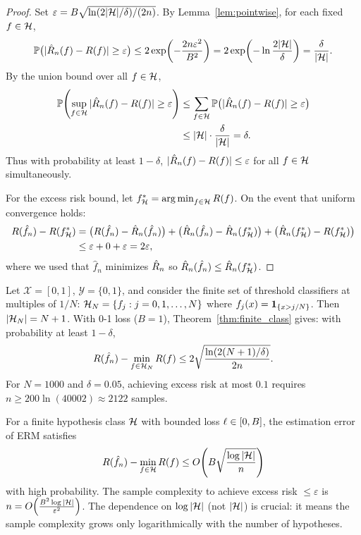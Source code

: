 \documentclass[11pt,a4paper]{article}
\begin{document}
\begin{proof}
Set $\varepsilon = B\sqrt{\ln(2|\mathcal{H}|/\delta)/(2n)}$.  By
Lemma~\ref{lem:pointwise}, for each fixed $f \in \mathcal{H}$,
\[
    \mathbb{P}\bigl(|\hat{R}_n(f) - R(f)| \geq \varepsilon\bigr)
    \leq 2\exp\!\left(-\frac{2n\varepsilon^2}{B^2}\right)
    = 2\exp\!\left(-\ln\frac{2|\mathcal{H}|}{\delta}\right)
    = \frac{\delta}{|\mathcal{H}|}.
\]
By the union bound over all $f \in \mathcal{H}$,
\begin{align*}
    \mathbb{P}\!\left(\sup_{f \in \mathcal{H}}
    |\hat{R}_n(f) - R(f)| \geq \varepsilon\right)
    &\leq \sum_{f \in \mathcal{H}}
    \mathbb{P}\bigl(|\hat{R}_n(f) - R(f)| \geq \varepsilon\bigr) \\
    &\leq |\mathcal{H}| \cdot \frac{\delta}{|\mathcal{H}|} = \delta.
\end{align*}
Thus with probability at least $1 - \delta$,
$|\hat{R}_n(f) - R(f)| \leq \varepsilon$ for all
$f \in \mathcal{H}$ simultaneously.

For the excess risk bound, let $f_{\mathcal{H}}^* = \operatorname{arg\,min}_{f \in \mathcal{H}}
R(f)$.  On the event that uniform convergence holds:
\begin{align*}
    R(\hat{f}_n) - R(f_{\mathcal{H}}^*)
    &= \bigl(R(\hat{f}_n) - \hat{R}_n(\hat{f}_n)\bigr)
    + \bigl(\hat{R}_n(\hat{f}_n) - \hat{R}_n(f_{\mathcal{H}}^*)\bigr)
    + \bigl(\hat{R}_n(f_{\mathcal{H}}^*) - R(f_{\mathcal{H}}^*)\bigr) \\
    &\leq \varepsilon + 0 + \varepsilon = 2\varepsilon,
\end{align*}
where we used that $\hat{f}_n$ minimizes $\hat{R}_n$ so
$\hat{R}_n(\hat{f}_n) \leq \hat{R}_n(f_{\mathcal{H}}^*)$.
\end{proof}

\begin{example}
\label{ex:threshold}
Let $\mathcal{X} = [0, 1]$, $\mathcal{Y} = \{0, 1\}$, and consider
the finite set of threshold classifiers at multiples of $1/N$:
$\mathcal{H}_N = \{f_j : j = 0, 1, \ldots, N\}$ where
$f_j(x) = \mathbf{1}_{\{x > j/N\}}$.  Then $|\mathcal{H}_N| = N + 1$.
With 0-1 loss ($B = 1$), Theorem~\ref{thm:finite_class} gives: with
probability at least $1 - \delta$,
\[
    R(\hat{f}_n) - \min_{f \in \mathcal{H}_N} R(f)
    \leq 2\sqrt{\frac{\ln(2(N+1)/\delta)}{2n}}.
\]
For $N = 1000$ and $\delta = 0.05$, achieving excess risk at most
$0.1$ requires $n \geq 200 \ln(40002) \approx 2122$ samples.
\end{example}

\begin{keyresult}[title={Finite Class Generalization Bound}]
For a finite hypothesis class $\mathcal{H}$ with bounded loss $\ell
\in [0, B]$, the estimation error of ERM satisfies
\[
    R(\hat{f}_n) - \min_{f \in \mathcal{H}} R(f)
    \leq O\!\left(B\sqrt{\frac{\log |\mathcal{H}|}{n}}\right)
\]
with high probability.  The sample complexity to achieve excess risk
$\leq \varepsilon$ is $n = O\!\left(\frac{B^2 \log |\mathcal{H}|}
{\varepsilon^2}\right)$.  The dependence on $\log |\mathcal{H}|$ (not
$|\mathcal{H}|$) is crucial: it means the sample complexity grows only
logarithmically with the number of hypotheses.
\end{keyresult}
\end{document}
